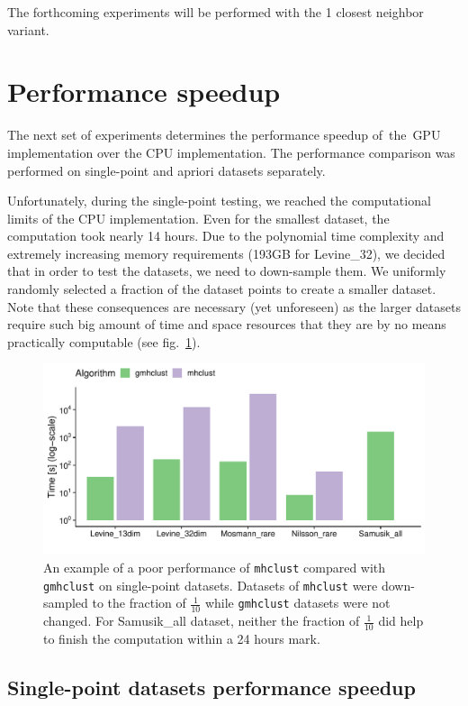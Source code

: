 The forthcoming experiments will be performed with the 1 closest neighbor variant.

\section{Performance speedup}

The next set of experiments determines the performance speedup of~the~GPU implementation over the CPU implementation. The performance comparison was performed on single-point and apriori datasets separately.

Unfortunately, during the single-point testing, we reached the computational limits of the CPU implementation. Even for the smallest dataset, the computation took nearly 14 hours. Due to the polynomial time complexity and extremely increasing memory requirements (193GB for Levine\_32), we decided that in order to test the datasets, we need to down-sample them. We uniformly randomly selected a fraction of the dataset points to create a smaller dataset. Note that these consequences are necessary (yet unforeseen) as the larger datasets require such big amount of time and space resources that they are by no means practically computable (see fig.~\ref{fig04:fract_comp}).

\begin{figure}\centering
	\includegraphics[width=\linewidth]{img/mixed_perf_comp}
	\caption{An example of a poor performance of \texttt{mhclust} compared with \texttt{gmhclust} on single-point datasets. Datasets of \texttt{mhclust} were down-sampled to the fraction of $\frac{1}{10}$ while \texttt{gmhclust} datasets were not changed. For Samusik\_all dataset, neither the fraction of $\frac{1}{10}$ did help to finish the computation within a 24 hours mark.}
	\label{fig04:fract_comp}
\end{figure}

\subsection{Single-point datasets performance speedup}

